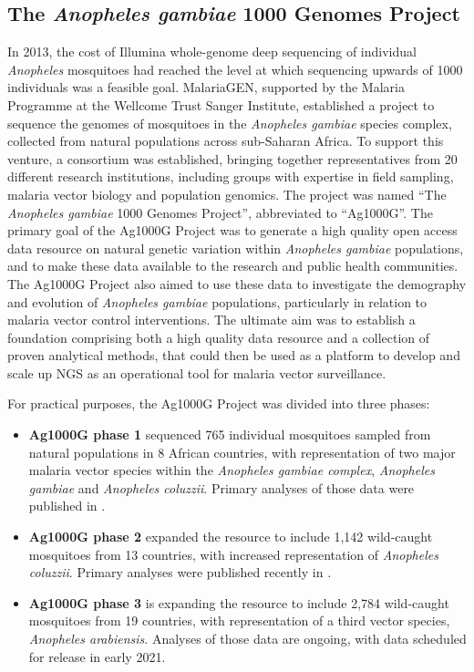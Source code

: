 \begin{refsection}
\section{The \textit{Anopheles gambiae} 1000 Genomes Project}\label{sec:ag1000g}


In 2013, the cost of Illumina whole-genome deep sequencing of individual \textit{Anopheles} mosquitoes had reached the level at which sequencing upwards of 1000 individuals was a feasible goal.
%
MalariaGEN, supported by the Malaria Programme at the Wellcome Trust Sanger Institute, established a project to sequence the genomes of mosquitoes in the \textit{Anopheles gambiae} species complex, collected from natural populations across sub-Saharan Africa.
%
To support this venture, a consortium was established, bringing together representatives from 20 different research institutions, including groups with expertise in field sampling, malaria vector biology and population genomics.
%
The project was named ``The \textit{Anopheles gambiae} 1000 Genomes Project'', abbreviated to ``Ag1000G''.
%
The primary goal of the Ag1000G Project was to generate a high quality open access data resource on natural genetic variation within \textit{Anopheles gambiae} populations, and to make these data available to the research and public health communities.
%
The Ag1000G Project also aimed to use these data to investigate the demography and evolution of \textit{Anopheles gambiae} populations, particularly in relation to malaria vector control interventions.
%
The ultimate aim was to establish a foundation comprising both a high quality data resource and a collection of proven analytical methods, that could then be used as a platform to develop and scale up NGS as an operational tool for malaria vector surveillance.
%

For practical purposes, the Ag1000G Project was divided into three phases:
%
\begin{itemize}
%
\item \textbf{Ag1000G phase 1} sequenced 765 individual mosquitoes sampled from natural populations in 8 African countries, with representation of two major malaria vector species within the \textit{Anopheles gambiae complex}, \textit{Anopheles gambiae} and \textit{Anopheles coluzzii}.
%
Primary analyses of those data were published in \textcite{Ag1000G2017}.
%
\item \textbf{Ag1000G phase 2} expanded the resource to include 1,142 wild-caught mosquitoes from 13 countries, with increased representation of \textit{Anopheles coluzzii}.
%
Primary analyses were published recently in \textcite{Ag1000G2020}.
%
\item \textbf{Ag1000G phase 3} is expanding the resource to include 2,784 wild-caught mosquitoes from 19 countries, with representation of a third vector species, \textit{Anopheles arabiensis}.
%
Analyses of those data are ongoing, with data scheduled for release in early 2021.
%
\end{itemize}




\end{refsection}
